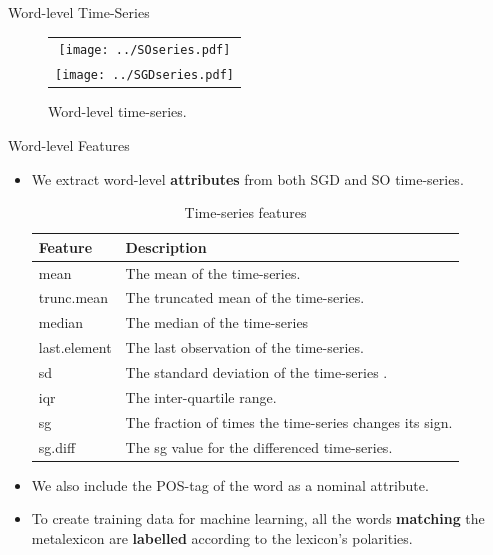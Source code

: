 \documentclass[handout]{beamer}
\begin{document}
\begin{frame}{Word-level Time-Series}
\begin{scriptsize}
\begin{figure}[htb]
\begin{center}
\begin{tabular}{c}
\texttt{[image: ../SOseries.pdf]} \\
\texttt{[image: ../SGDseries.pdf]}\\
\end{tabular}
\caption{Word-level time-series.}
\label{fig:timeseries}
\end{center}
\end{figure}
\end{scriptsize}

\end{frame}



\begin{frame}{Word-level Features}
\begin{scriptsize}
\begin{itemize}
\item We extract word-level \textbf{attributes} from both SGD and SO time-series.
\begin{table}[htbp]
\footnotesize
\begin{center}
\begin{tabular}{l|l}
\hline
Feature & Description \\ \hline
mean &  The mean of the time-series. \\ 
trunc.mean &  The truncated mean of the time-series. \\ 
median &  The median of the time-series \\ 
last.element &  The last observation of the time-series.\\ 
sd &  The standard deviation of the time-series . \\ 
iqr &  The inter-quartile range. \\ 
sg &  The fraction of times the time-series changes its sign. \\ 
sg.diff &  The sg value for the  differenced time-series. \\ \hline
\end{tabular}
\end{center}
\caption{Time-series features}
\label{tab:feat}
\end{table}

\item We also include the POS-tag of the word as a nominal attribute.

\item To create training data for machine learning, all the words \textbf{matching} the metalexicon are \textbf{labelled} according to the lexicon's polarities.

\end{itemize}
\end{scriptsize}

\end{frame}
\end{document}
